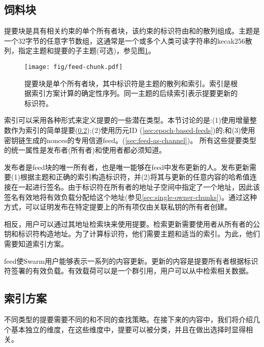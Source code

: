 \subsection{饲料块\statusyellow}\label{sec:feed-chunks}

提要块是具有相关约束的单个所有者块，该约束的标识符由和的散列组成。主题是一个32字节的任意字节数组，这通常是一个或多个人类可读字符串的kecak256散列，指定主题和提要的子主题(可选)，参见图\ref{fig:feed-chunk}。 


\begin{figure}[htbp]
\centering
\texttt{[image: fig/feed-chunk.pdf]}
\caption[饲料块\statusgreen]{提要块是单个所有者块，其中标识符是主题的散列和索引。索引是根据索引方案计算的确定性序列。同一主题的后续索引表示提要更新的标识符。}
\label{fig:feed-chunk}
\end{figure}

索引可以采用各种形式来定义提要的一些潜在类型。本节讨论的是:(1)使用增量整数作为索引的简单提要(\ref{sec:indexing-schemes});(2)使用历元ID (\ref{sec:epoch-based-feeds})的;和(3)使用密钥链生成的nonces的专用信道feed。(\ref{sec:feed-as-channel})。
所有这些提要类型的统一属性是发布者(所有者)和使用者都必须知道。

发布者是feed块的唯一所有者，也是唯一能够在feed中发布更新的人。发布更新需要(1)根据主题和正确的索引构造标识符，并(2)将其与更新的任意内容的哈希值连接在一起进行签名。由于标识符在所有者的地址子空间中指定了一个地址，因此该签名有效地将有效负载分配给这个地址(参见\ref{sec:single-owner-chunks})。通过这种方式，可以证明发布在特定提要上的所有项仅由关联私钥的所有者创建。

相反，用户可以通过其地址检索块来使用提要。检索更新需要使用者从所有者的公钥和标识符构造地址。为了计算标识符，他们需要主题和适当的索引。为此，他们需要知道索引方案。

feed使Swarm用户能够表示一系列的内容更新。更新的内容是提要所有者根据标识符签署的有效负载。有效载荷可以是一个群引用，用户可以从中检索相关数据。

\subsection{索引方案\statusyellow}\label{sec:indexing-schemes}

不同类型的提要需要不同的和不同的查找策略。在接下来的内容中，我们将介绍几个基本独立的维度，在这些维度中，提要可以被分类，并且在做出选择时显得相关。


